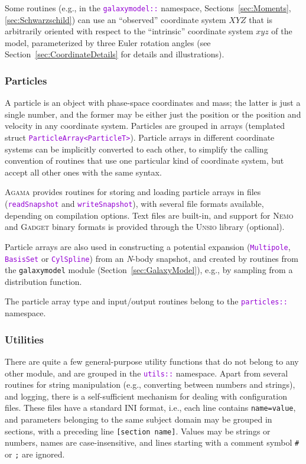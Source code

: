 \documentclass[12pt]{article}
\newcommand{\Agama}{\textsc{Agama}\xspace}
\newcommand{\Nemo} {\textsc{Nemo}\xspace}
\newcommand{\Nbody}{\textsl{N}-body\xspace}
\newcommand{\ttt}[1]{\textcolor{darkviolet}{\texttt{#1}}}
\newcommand{\ppp}[1]{\textcolor{darkolive} {\texttt{#1}}}
\begin{document}
Some routines (e.g., in the \ttt{galaxymodel::} namespace, Sections~\ref{sec:Moments}, \ref{sec:Schwarzschild}) can use an ``observed'' coordinate system $XYZ$ that is arbitrarily oriented with respect to the ``intrinsic'' coordinate system $xyz$ of the model, parameterized by three Euler rotation angles (see Section~\ref{sec:CoordinateDetails} for details and illustrations).

\subsubsection{Particles}  \label{sec:Particles}
A particle is an object with phase-space coordinates and mass; the latter is just a single number, and the former may be either just the position or the position and velocity in any coordinate system. Particles are grouped in arrays (templated struct \ttt{ParticleArray<ParticleT>}).
Particle arrays in different coordinate systems can be implicitly converted to each other, to simplify the calling convention of routines that use one particular kind of coordinate system, but accept all other ones with the same syntax.

\Agama provides routines for storing and loading particle arrays in files (\ttt{readSnapshot} and \ttt{writeSnapshot}), with several file formats available, depending on compilation options. Text files are built-in, and support for \Nemo and \textsc{Gadget} binary formats is provided through the \textsc{Unsio} library (optional).

Particle arrays are also used in constructing a potential expansion (\ttt{Multipole}, \ttt{BasisSet} or \ttt{CylSpline}) from an \Nbody snapshot, and created by routines from the \texttt{galaxymodel} module (Section~\ref{sec:GalaxyModel}), e.g., by sampling from a distribution function.

The particle array type and input/output routines belong to the \ttt{particles::} name\-space.


\subsubsection{Utilities}  \label{sec:Utilities}

There are quite a few general-purpose utility functions that do not belong to any other module, and are grouped in the \ttt{utils::} namespace. 
Apart from several routines for string manipulation (e.g., converting between numbers and strings), and logging, there is a self-sufficient mechanism for dealing with configuration files. These files have a standard INI format, i.e., each line contains \ppp{name=value}, and parameters belonging to the same subject domain may be grouped in sections, with a preceding line \ppp{[section name]}. Values may be strings or numbers, names are case-insensitive, and lines starting with a comment symbol \texttt{\#} or \texttt{;} are ignored.
\end{document}
